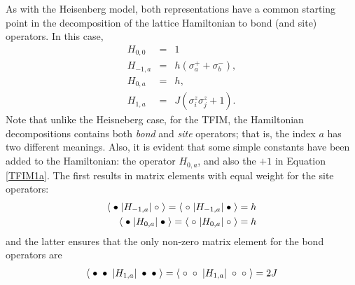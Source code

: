 \documentclass[vecphys]{svmult}
\begin{document}
As with the Heisenberg model, both representations have a common starting point in the decomposition of the lattice Hamiltonian to bond (and site) operators.  In this case, 
\begin{eqnarray}
H_{0,0} &=& 1 \label {TFIM00} \\
H_{-1,a} &=& h(\sigma^+_a + \sigma^-_b), \label{TFIM-1a} \\
H_{0,a} &=& h, \\
H_{1,a} &=& J (\sigma^z_i \sigma^z_j + 1).  \label{TFIM1a}
\end{eqnarray}
Note that unlike the Heisneberg case, for the TFIM, the Hamiltonian decompositions contains both {\it bond} and {\it site} operators; that is, the index $a$ has two different meanings.  Also, it is evident that some simple constants have been added to the Hamiltonian:  the operator $H_{0,a}$, and also the $+1$ in Equation \ref{TFIM1a}.  The first results in matrix elements with equal weight for the site operators:
\begin{eqnarray}
\langle \hspace{1mm} \bullet \hspace{1mm}  | H_{-1,a} |\hspace{1mm} \circ \hspace{1mm} \rangle = 
\langle \hspace{1mm} \circ \hspace{1mm}  | H_{-1,a} |\hspace{1mm} \bullet \hspace{1mm} \rangle = h \label {Tw1} \\
\langle \hspace{1mm}  \bullet \hspace{1mm}  | H_{0,a} | \hspace{1mm} \bullet \hspace{1mm} \rangle = 
\langle \hspace{1mm}  \circ \hspace{1mm}  | H_{0,a} | \hspace{1mm} \circ \hspace{1mm} \rangle = h \label{Tw2}
\end{eqnarray} 
and the latter ensures that the only non-zero matrix element for the bond operators are
\begin{eqnarray}
\langle \hspace{1mm} \bullet \hspace{1mm}  \bullet \hspace{1mm}  | H_{1,a} | \hspace{1mm} \bullet \hspace{1mm} \bullet \hspace{1mm} \rangle = 
\langle \hspace{1mm} \circ \hspace{1mm}  \circ \hspace{1mm}  | H_{1,a} | \hspace{1mm} \circ \hspace{1mm} \circ \hspace{1mm} \rangle = 2J \label {Tfimdiag} 
\end{eqnarray}
\end{document}
